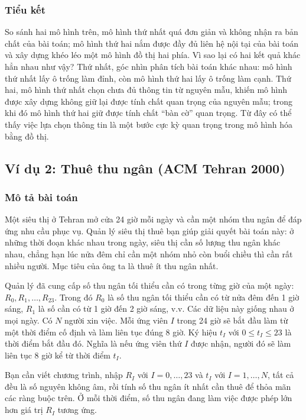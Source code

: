 \documentclass[11pt]{article}
\begin{document}
\subsubsection*{Tiểu kết}

So sánh hai mô hình trên, mô hình thứ nhất quá đơn giản và không nhận ra bản
chất của bài toán; mô hình thứ hai nắm được đầy đủ liên hệ nội tại của bài
toán và xây dựng khéo léo một mô hình đồ thị hai phía. Vì sao lại có hai kết
quả khác hẳn nhau như vậy? Thứ nhất, góc nhìn phân tích bài toán khác nhau:
mô hình thứ nhất lấy ô trống làm đỉnh, còn mô hình thứ hai lấy ô trống làm
cạnh. Thứ hai, mô hình thứ nhất chọn chưa đủ thông tin từ nguyên mẫu, khiến
mô hình được xây dựng không giữ lại được tính chất quan trọng của nguyên mẫu;
trong khi đó mô hình thứ hai giữ được tính chất ``bàn cờ'' quan trọng. Từ đây
có thể thấy việc lựa chọn thông tin là một bước cực kỳ quan trọng trong mô
hình hóa bằng đồ thị.

\subsection{Ví dụ 2: Thuê thu ngân (ACM Tehran 2000)}

\subsubsection*{Mô tả bài toán}

Một siêu thị ở Tehran mở cửa 24 giờ mỗi ngày và cần một nhóm thu ngân để đáp
ứng nhu cầu phục vụ. Quản lý siêu thị thuê bạn giúp giải quyết bài toán này:
ở những thời đoạn khác nhau trong ngày, siêu thị cần số lượng thu ngân khác
nhau, chẳng hạn lúc nửa đêm chỉ cần một nhóm nhỏ còn buổi chiều thì cần rất
nhiều người. Mục tiêu của ông ta là thuê ít thu ngân nhất.

Quản lý đã cung cấp số thu ngân tối thiểu cần có trong từng giờ của một ngày:
$R_0,R_1,\ldots,R_{23}$. Trong đó $R_0$ là số thu ngân tối thiểu cần có từ
nửa đêm đến 1 giờ sáng, $R_1$ là số cần có từ 1 giờ đến 2 giờ sáng, v.v. Các
dữ liệu này giống nhau ở mọi ngày. Có $N$ người xin việc. Mỗi ứng viên $I$
trong 24 giờ sẽ bắt đầu làm từ một thời điểm cố định và làm liên tục đúng
8 giờ. Ký hiệu $t_I$ với $0\le t_I\le 23$ là thời điểm bắt đầu đó. Nghĩa là
nếu ứng viên thứ $I$ được nhận, người đó sẽ làm liên tục 8 giờ kể từ thời
điểm $t_I$.

Bạn cần viết chương trình, nhập $R_I$ với $I=0,\ldots,23$ và $t_I$ với
$I=1,\ldots,N$, tất cả đều là số nguyên không âm, rồi tính số thu ngân ít
nhất cần thuê để thỏa mãn các ràng buộc trên. Ở mỗi thời điểm, số thu ngân
đang làm việc được phép lớn hơn giá trị $R_I$ tương ứng.
\end{document}
